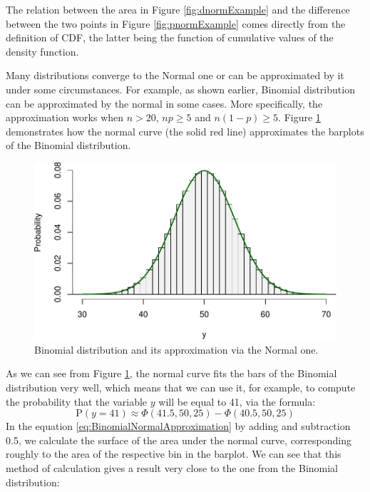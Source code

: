 \documentclass[
]{book}
\theoremstyle{definition}
\theoremstyle{definition}
\theoremstyle{definition}
\theoremstyle{definition}
\theoremstyle{remark}
\begin{document}
The relation between the area in Figure \ref{fig:dnormExample} and the difference between the two points in Figure \ref{fig:pnormExample} comes directly from the definition of CDF, the latter being the function of cumulative values of the density function.

Many distributions converge to the Normal one or can be approximated by it under some circumstances. For example, as shown earlier, Binomial distribution can be approximated by the normal in some cases. More specifically, the approximation works when \(n>20\), \(n p \geq 5\) and \(n(1-p) \geq 5\). Figure \ref{fig:binomialNormalApprox} demonstrates how the normal curve (the solid red line) approximates the barplots of the Binomial distribution.

\begin{figure}
\centering
\includegraphics{Svetunkov---Statistics-for-Business-Analytics_files/figure-latex/binomialNormalApprox-1.pdf}
\caption{\label{fig:binomialNormalApprox}Binomial distribution and its approximation via the Normal one.}
\end{figure}

As we can see from Figure \ref{fig:binomialNormalApprox}, the normal curve fits the bars of the Binomial distribution very well, which means that we can use it, for example, to compute the probability that the variable \(y\) will be equal to 41, via the formula:
\begin{equation}
    \mathrm{P}(y=41) \approx \Phi(41.5, 50, 25) - \Phi(40.5, 50, 25)
    \label{eq:BinomialNormalApproximation}
\end{equation}
In the equation \eqref{eq:BinomialNormalApproximation} by adding and subtraction 0.5, we calculate the surface of the area under the normal curve, corresponding roughly to the area of the respective bin in the barplot. We can see that this method of calculation gives a result very close to the one from the Binomial distribution:
\end{document}
